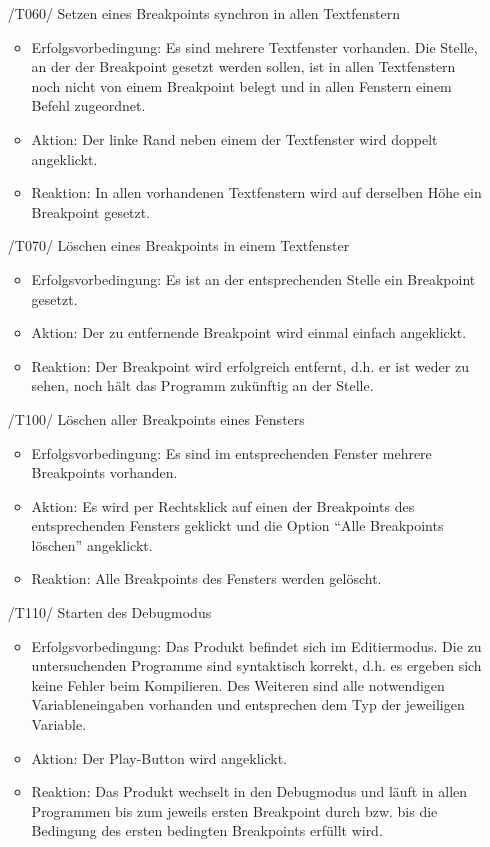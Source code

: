 \documentclass[parskip=full]{scrartcl}
\begin{document}
\begin{itemize}

	\item[/T060/] Setzen eines \glspl{Breakpoint} synchron in allen Textfenstern
	\begin{itemize}
		\item Erfolgsvorbedingung: Es sind mehrere Textfenster vorhanden. Die Stelle, an der der Breakpoint gesetzt werden sollen, ist in allen Textfenstern noch nicht von einem Breakpoint belegt und in allen Fenstern einem Befehl zugeordnet. 
		\item Aktion: Der linke Rand neben einem der Textfenster wird doppelt angeklickt.	
		\item Reaktion:	In allen vorhandenen Textfenstern wird auf derselben Höhe ein Breakpoint gesetzt.
	\end{itemize}		
	
	\item[/T070/] Löschen eines Breakpoints in einem Textfenster
		\begin{itemize}
		\item Erfolgsvorbedingung: Es ist an der entsprechenden Stelle ein Breakpoint gesetzt.	
		\item Aktion: Der zu entfernende Breakpoint wird einmal einfach angeklickt.
		\item Reaktion:	Der \gls{Breakpoint} wird erfolgreich entfernt, d.h. er ist weder zu sehen, noch hält das Programm zukünftig an der Stelle.
		\end{itemize}		
		
		
	\item[/T100/] Löschen aller Breakpoints eines Fensters
		\begin{itemize}
		\item Erfolgsvorbedingung: Es sind im entsprechenden Fenster mehrere Breakpoints vorhanden.
		\item Aktion: Es wird per Rechtsklick auf einen der Breakpoints des entsprechenden Fensters geklickt und die Option \enquote{Alle Breakpoints löschen} angeklickt.
		\item Reaktion:	Alle Breakpoints des Fensters werden gelöscht.
		\end{itemize}		
	
	\item[/T110/] Starten des \gls{Debugmodus}
		\begin{itemize}
		\item Erfolgsvorbedingung: Das Produkt befindet sich im \gls{Editiermodus}. Die zu untersuchenden Programme sind syntaktisch korrekt, d.h. es ergeben sich keine Fehler beim Kompilieren. Des Weiteren sind alle notwendigen Variableneingaben vorhanden und entsprechen dem Typ der jeweiligen Variable.
		\item Aktion: Der Play-Button wird angeklickt.
		\item Reaktion:	Das Produkt wechselt in den Debugmodus und läuft in allen Programmen bis zum jeweils ersten Breakpoint durch bzw. bis die Bedingung des ersten bedingten Breakpoints erfüllt wird.
		\end{itemize}		
	

\end{itemize}
\end{document}
